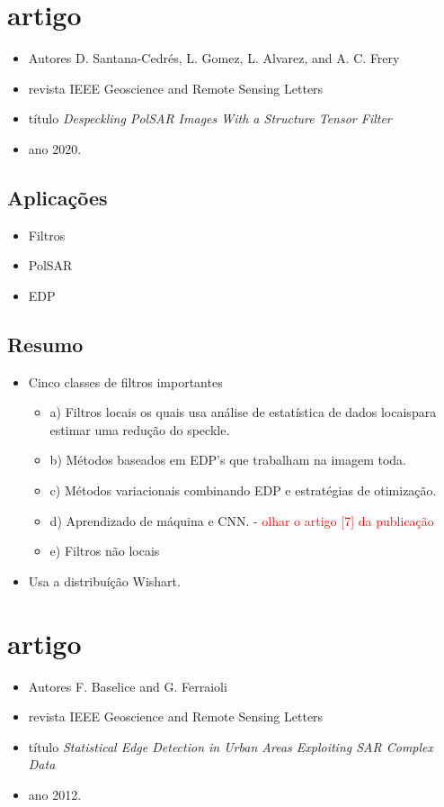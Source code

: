 \documentclass{article}
\begin{document}
\section{artigo \cite{cgaf}}
\begin{itemize}
\item Autores D. Santana-Cedrés, L. Gomez, L. Alvarez, and A. C. Frery
\item revista IEEE Geoscience and Remote Sensing Letters
\item título \textit{Despeckling PolSAR Images With a Structure Tensor Filter}
\item ano 2020.
\end{itemize}
\subsection{Aplicações}
\begin{itemize}
\item Filtros
\item PolSAR
\item EDP
\end{itemize}
\subsection{Resumo}
\begin{itemize}
\item Cinco classes de filtros importantes
\begin{itemize}
\item a) Filtros locais os quais usa análise de estatística de dados locaispara estimar uma redução do speckle.
\item b) Métodos baseados em EDP's que trabalham na imagem toda.
\item c) Métodos variacionais combinando EDP e estratégias de otimização.
\item d) Aprendizado de máquina e CNN. - \textcolor{red}{olhar o artigo [7] da publicação}
\item e) Filtros não locais
\end{itemize}
\item Usa a distribuíção Wishart.
\end{itemize}
 
\section{artigo \cite{bf}}
\begin{itemize}
\item Autores F. Baselice and G. Ferraioli
\item revista IEEE Geoscience and Remote Sensing Letters
\item título \textit{Statistical Edge Detection in Urban Areas Exploiting {SAR} Complex Data}
\item ano 2012.
\end{itemize}
\end{document}
